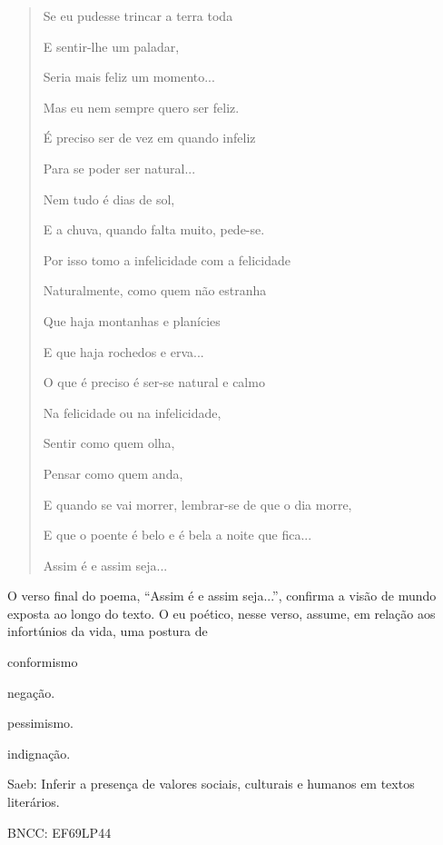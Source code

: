 \begin{quote}
Se eu pudesse trincar a terra toda

E sentir-lhe um paladar,

Seria mais feliz um momento...

Mas eu nem sempre quero ser feliz.

É preciso ser de vez em quando infeliz

Para se poder ser natural...

Nem tudo é dias de sol,

E a chuva, quando falta muito, pede-se.

Por isso tomo a infelicidade com a felicidade

Naturalmente, como quem não estranha

Que haja montanhas e planícies

E que haja rochedos e erva...

O que é preciso é ser-se natural e calmo

Na felicidade ou na infelicidade,

Sentir como quem olha,

Pensar como quem anda,

E quando se vai morrer, lembrar-se de que o dia morre,

E que o poente é belo e é bela a noite que fica...

Assim é e assim seja...
\end{quote}


O verso final do poema, ``Assim é e assim seja...'', confirma a visão de
mundo exposta ao longo do texto. O eu poético, nesse verso, assume, em
relação aos infortúnios da vida, uma postura de

\begin{escolha}
\item conformismo

\item negação.

\item pessimismo.

\item indignação.
\end{escolha}

Saeb: Inferir a presença de valores sociais, culturais e humanos em
textos literários.

BNCC: EF69LP44

